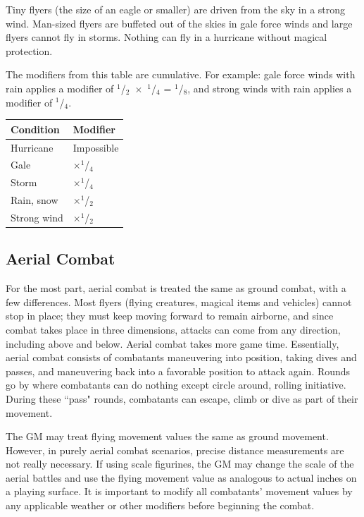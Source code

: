 \begin{multicols}{2}
Tiny flyers (the size of an eagle or smaller) are driven from the sky in a strong wind.  Man-sized flyers are buffeted out of the skies in gale force winds and large flyers cannot fly in storms.  Nothing can fly in a hurricane without magical protection.

The modifiers from this table are cumulative.  For example: gale force winds with rain applies a modifier of $^1$/$_2$~$\times$~$^1$/$_4$ = $^1$/$_8$, and strong winds with rain applies a modifier of $^1$/$_4$.

\noindent
\begin{minipage}{\columnwidth}

\label{aerialmods}
\noindent
\begin{tabular}{|p{}|p{}|}
\hline
Condition		& Modifier \\
\hline\hline
\rowcolor[gray]{.9}Hurricane		& Impossible \\
Gale			& $\times$$^1$/$_4$ \\
\rowcolor[gray]{.9}Storm			& $\times$$^1$/$_4$ \\
Rain, snow		& $\times$$^1$/$_2$ \\
\rowcolor[gray]{.9}Strong wind		& $\times$$^1$/$_2$ \\
\hline
\end{tabular}

\end{minipage}

\subsection{Aerial Combat}

For the most part, aerial combat is treated the same as ground combat, with a few differences.  Most flyers (flying creatures, magical items and vehicles) cannot stop in place; they must keep moving forward to remain airborne, and since combat takes place in three dimensions, attacks can come from any direction, including above and below.  Aerial combat takes more game time.  Essentially, aerial combat consists of combatants maneuvering into position, taking dives and passes, and maneuvering back into a favorable position to attack again.  Rounds go by where combatants can do nothing except circle around, rolling initiative.  During these ``pass" rounds, combatants can escape, climb or dive as part of their movement.

The GM may treat flying movement values the same as ground movement. However, in purely aerial combat scenarios, precise distance measurements are not really necessary.   If using scale figurines, the GM may change the scale of the aerial battles and use the flying movement value as analogous to actual inches on a playing surface.  It is important to modify all combatants' movement values by any applicable weather or other modifiers before beginning the combat.


\end{multicols}
